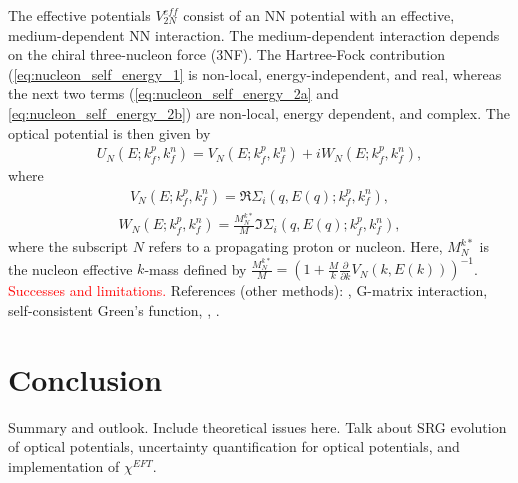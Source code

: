 \documentclass[preprintnumbers,floatfix,aps,prc,preprint,nofootinbib]{revtex4-1}
\begin{document}
The effective potentials $V_{2N}^{eff}$ consist of an NN potential with an effective, medium-dependent NN interaction. The medium-dependent interaction depends on the chiral three-nucleon force (3NF). The Hartree-Fock contribution (\ref{eq:nucleon_self_energy_1} is non-local, energy-independent, and real, whereas the next two terms (\ref{eq:nucleon_self_energy_2a} and \ref{eq:nucleon_self_energy_2b}) are non-local, energy dependent, and complex. The optical potential is  then given by
%
\begin{eqnarray}
	\label{eq:nucleon_self_energy_optical_potential}
	U_N(E; k_f^p, k_f^n) = V_N(E; k_f^p, k_f^n) + i W_N(E; k_f^p, k_f^n),
\end{eqnarray}
%
where
\begin{eqnarray}
	\label{eq:nucleon_self_energy_optical_potential_real}
	V_N(E; k_f^p, k_f^n) = \Re \Sigma_i (q, E(q); k_f^p, k_f^n),
\end{eqnarray}
%
\begin{eqnarray}
	\label{eq:nucleon_self_energy_optical_potential_imaginary}
	W_N(E; k_f^p, k_f^n) = \frac{M_N^{k*}}{M} \Im \Sigma_i (q, E(q); k_f^p, k_f^n),
\end{eqnarray}
%
where the subscript $N$ refers to a propagating proton or nucleon. Here, $M_N^{k*}$ is the nucleon effective $k$-mass defined by $\frac{M_N^{k*}}{M} = (1+\frac{M}{k} \frac{\partial}{\partial k} V_N(k, E(k)))^{-1}$.
\\

\textcolor{red}{Successes and limitations.} References (other methods): \cite{Dickhoff:2018wdd}, \cite{Furumoto:2019anr} G-matrix interaction, \cite{Idini:2019hkq} self-consistent Green's function, \cite{Rotureau:2016jpf}, \cite{Jeukenne:1977zz}.


\section{Conclusion}
\label{sec:conclusion}


Summary and outlook. Include theoretical issues here. Talk about SRG evolution of optical potentials, uncertainty quantification for optical potentials, and implementation of $\chi^{EFT}$.
\\





\end{document}
